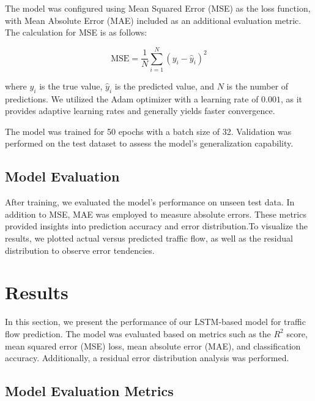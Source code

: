 \documentclass[conference]{IEEEtran}
\begin{document}
The model was configured using Mean Squared Error (MSE) as the loss function, with Mean Absolute Error (MAE) included as an additional evaluation metric. The calculation for MSE is as follows:

\begin{equation}
    \text{MSE} = \frac{1}{N} \sum_{i=1}^{N} (y_i - \hat{y}_i)^2
\end{equation}

where $y_i$ is the true value, $\hat{y}_i$ is the predicted value, and $N$ is the number of predictions. We utilized the Adam optimizer with a learning rate of $0.001$, as it provides adaptive learning rates and generally yields faster convergence.

The model was trained for 50 epochs with a batch size of 32. Validation was performed on the test dataset to assess the model's generalization capability.

\subsection{Model Evaluation}

After training, we evaluated the model’s performance on unseen test data. In addition to MSE, MAE was employed to measure absolute errors. These metrics provided insights into prediction accuracy and error distribution.To visualize the results, we plotted actual versus predicted traffic flow, as well as the residual distribution to observe error tendencies. 











\section{Results}

In this section, we present the performance of our LSTM-based model for traffic flow prediction. The model was evaluated based on metrics such as the \( R^2 \) score, mean squared error (MSE) loss, mean absolute error (MAE), and classification accuracy. Additionally, a residual error distribution analysis was performed.

\subsection{Model Evaluation Metrics}
\end{document}
